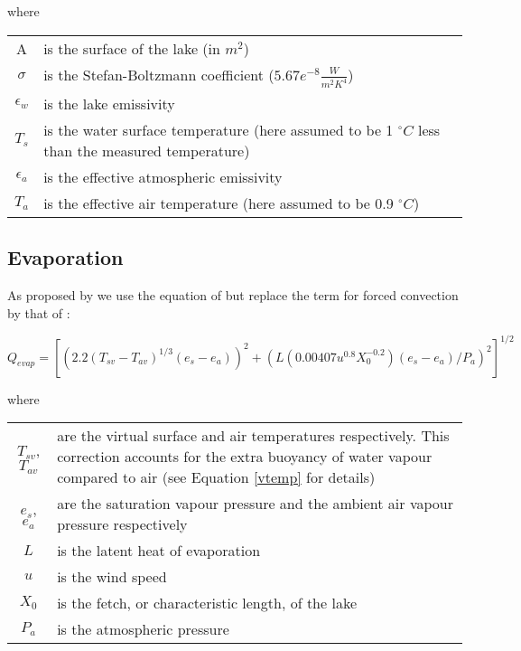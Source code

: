 \documentclass{bmcart}
\begin{document}
where
\begin{table}[h!]
\begin{tabular}{cp{8cm}}
    A & is the surface of the lake (in $m^2$) \\
    $\sigma$ & is the Stefan-Boltzmann coefficient ($5.67e^{-8} \frac{W}{m^2 K^4}$) \\
    $\epsilon_w$ & is the lake emissivity \\
    $T_s$ & is the water surface temperature (here assumed to be 1 $^{\circ}C$ less than the
    measured temperature) \\
    $\epsilon_a$ & is the effective atmospheric emissivity \\
    $T_a$ & is the effective air temperature (here assumed to be 0.9 $^{\circ}C$) \\ 
\end{tabular}
\end{table}

\subsection{Evaporation}
As proposed by \cite{hurstCraterLakeEnergy2015} we use the equation of
\cite{adamsEvaporationHeatedWater1990} but replace the term for forced
convection by that of \cite{sartoriCriticalReviewEquations2000}:

\begin{equation}
    Q_{evap} = [(2.2(T_{sv} - T_{av})^{1/3}(e_s - e_a))^2 + 
    (L(0.00407u^{0.8}X_0^{-0.2})(e_s - e_a)/P_a)^2]^{1/2}
\end{equation}

where
\begin{table}[h!]
\begin{tabular}{cp{8cm}}
    $T_{sv}$, $T_{av}$ & are the virtual surface and air temperatures respectively.
    This correction accounts for the extra buoyancy of water vapour compared to air
    (see Equation \ref{vtemp} for details) \\
    $e_s$, $e_a$ & are the saturation vapour pressure and the ambient air vapour
    pressure respectively \\
    $L$ & is the latent heat of evaporation \\
    $u$ & is the wind speed \\
    $X_0$ & is the fetch, or characteristic length, of the lake\\
    $P_a$ & is the atmospheric pressure \\
\end{tabular}
\end{table}
\end{document}
